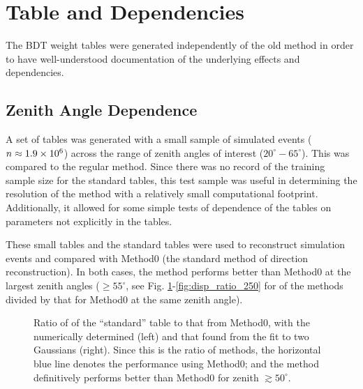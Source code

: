 \documentclass[main.tex]{subfiles}
\begin{document}
\section{\disp Table and \rse Dependencies}
The BDT weight tables were generated independently of the old \disp method in order to have well-understood documentation of the underlying effects and dependencies.

\subsection{Zenith Angle Dependence}
A set of \disp tables was generated with a small sample of simulated events ($n\approx 1.9\times 10^{6}$) across the range of zenith angles of interest ($20^\circ-65^\circ$). This was compared to the regular \disp method. Since there was no record of the training sample size for the standard tables, this test sample was useful in determining the resolution of the \disp method with a relatively small computational footprint. Additionally, it allowed for some simple tests of dependence of the \disp tables on parameters not explicitly in the \disp tables.

These small \disp tables and the standard \disp tables were used to reconstruct simulation events and compared with Method0 (the standard method of direction reconstruction). In both cases, the \disp method performs better than Method0 at the largest zenith angles ($\geq 55^\circ$, see Fig. \ref{fig:olddisp_ratio}-\ref{fig:disp_ratio_250} for \rse of the \disp methods divided by that for Method0 at the same zenith angle).

\begin{figure}[H]
  \begin{center}
      \caption[``standard'' \disp table reconstruction.]{Ratio of \rse of the ``standard'' \disp table to that from Method0, with the numerically determined \rse (left) and that found from the fit to two Gaussians (right). Since this is the ratio of methods, the horizontal blue line denotes the performance using Method0; and the \disp method definitively performs better than Method0 for zenith $\gtrsim50^\circ$.}  
      \label{fig:olddisp_ratio}
  \end{center}
\end{figure}
\end{document}
